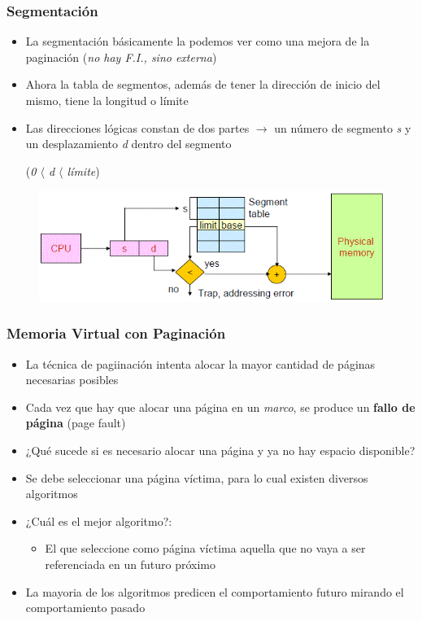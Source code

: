 \begin{frame}
  \frametitle{\textbf{Segmentación}}
  \begin{itemize}
  	\item La segmentación básicamente la podemos ver como una mejora de la paginación (\emph{no hay F.I., sino externa})  	
	\item Ahora la tabla de segmentos, además de tener la dirección de inicio del mismo, tiene la longitud o límite
	\item Las direcciones lógicas constan de dos partes $\rightarrow$ un número de segmento \emph{s} y un desplazamiento \emph{d} dentro del segmento 

	(\emph{0 $\langle$ d $\langle$ límite})
  \end{itemize}
  \begin{figure}
    \includegraphics[scale=0.3]{images/segmentation.png}
  \end{figure}  
\end{frame}

\begin{frame}
  \frametitle{\textbf{Memoria Virtual} con Paginación}
  \begin{itemize}
  	\item La técnica de pagiinación intenta alocar la mayor cantidad de páginas necesarias posibles
	\item Cada vez que hay que alocar una página en un \emph{marco}, se produce un \textbf{fallo de página} (page fault)
	\item ¿Qué sucede si es necesario alocar una página y ya no hay espacio disponible?
	\pause
	\item Se debe seleccionar una página víctima, para lo cual existen diversos algoritmos
	\item ¿Cuál es el mejor algoritmo?:
	\pause
	\begin{itemize}
		\item El que seleccione como página víctima aquella que no vaya a ser referenciada en un futuro próximo
	\end{itemize}
	\item La mayoria de los algoritmos predicen el comportamiento futuro mirando el comportamiento pasado
  \end{itemize}  
\end{frame}

